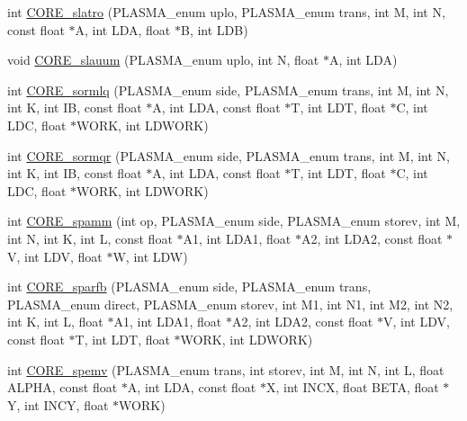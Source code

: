 \begin{DoxyCompactItemize}
\item 
int \hyperlink{group__CORE__float_ga5b2a443eb7b8e8130eca6752b90a7cd5_ga5b2a443eb7b8e8130eca6752b90a7cd5}{C\+O\+R\+E\+\_\+slatro} (P\+L\+A\+S\+M\+A\+\_\+enum uplo, P\+L\+A\+S\+M\+A\+\_\+enum trans, int M, int N, const float $\ast$A, int L\+D\+A, float $\ast$B, int L\+D\+B)
\item 
void \hyperlink{group__CORE__float_ga9be9eb6f4a1c853f5a0a6ce209e961f7_ga9be9eb6f4a1c853f5a0a6ce209e961f7}{C\+O\+R\+E\+\_\+slauum} (P\+L\+A\+S\+M\+A\+\_\+enum uplo, int N, float $\ast$A, int L\+D\+A)
\item 
int \hyperlink{group__CORE__float_gaa880a5ba2b5c999151ad7a4ca4542413_gaa880a5ba2b5c999151ad7a4ca4542413}{C\+O\+R\+E\+\_\+sormlq} (P\+L\+A\+S\+M\+A\+\_\+enum side, P\+L\+A\+S\+M\+A\+\_\+enum trans, int M, int N, int K, int I\+B, const float $\ast$A, int L\+D\+A, const float $\ast$T, int L\+D\+T, float $\ast$C, int L\+D\+C, float $\ast$W\+O\+R\+K, int L\+D\+W\+O\+R\+K)
\item 
int \hyperlink{group__CORE__float_ga68b2e8f67b90e332ed68d46645b09f0d_ga68b2e8f67b90e332ed68d46645b09f0d}{C\+O\+R\+E\+\_\+sormqr} (P\+L\+A\+S\+M\+A\+\_\+enum side, P\+L\+A\+S\+M\+A\+\_\+enum trans, int M, int N, int K, int I\+B, const float $\ast$A, int L\+D\+A, const float $\ast$T, int L\+D\+T, float $\ast$C, int L\+D\+C, float $\ast$W\+O\+R\+K, int L\+D\+W\+O\+R\+K)
\item 
int \hyperlink{group__CORE__float_ga6e78d99bb196027a86174b19ae47df8d_ga6e78d99bb196027a86174b19ae47df8d}{C\+O\+R\+E\+\_\+spamm} (int op, P\+L\+A\+S\+M\+A\+\_\+enum side, P\+L\+A\+S\+M\+A\+\_\+enum storev, int M, int N, int K, int L, const float $\ast$A1, int L\+D\+A1, float $\ast$A2, int L\+D\+A2, const float $\ast$V, int L\+D\+V, float $\ast$W, int L\+D\+W)
\item 
int \hyperlink{group__CORE__float_ga7dc42316aabbe76d58d539fc36c79fb6_ga7dc42316aabbe76d58d539fc36c79fb6}{C\+O\+R\+E\+\_\+sparfb} (P\+L\+A\+S\+M\+A\+\_\+enum side, P\+L\+A\+S\+M\+A\+\_\+enum trans, P\+L\+A\+S\+M\+A\+\_\+enum direct, P\+L\+A\+S\+M\+A\+\_\+enum storev, int M1, int N1, int M2, int N2, int K, int L, float $\ast$A1, int L\+D\+A1, float $\ast$A2, int L\+D\+A2, const float $\ast$V, int L\+D\+V, const float $\ast$T, int L\+D\+T, float $\ast$W\+O\+R\+K, int L\+D\+W\+O\+R\+K)
\item 
int \hyperlink{group__CORE__float_ga3170a8ce00fe7a827d8b7d478a29f2c6_ga3170a8ce00fe7a827d8b7d478a29f2c6}{C\+O\+R\+E\+\_\+spemv} (P\+L\+A\+S\+M\+A\+\_\+enum trans, int storev, int M, int N, int L, float A\+L\+P\+H\+A, const float $\ast$A, int L\+D\+A, const float $\ast$X, int I\+N\+C\+X, float B\+E\+T\+A, float $\ast$Y, int I\+N\+C\+Y, float $\ast$W\+O\+R\+K)

\end{DoxyCompactItemize}
